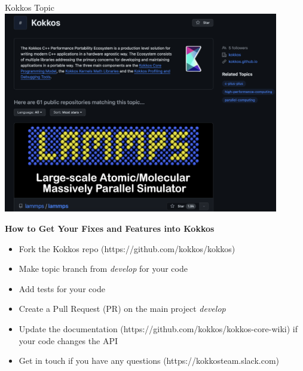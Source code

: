 \begin{frame}[fragile]{Kokkos Topic}
  \includegraphics[width=0.9\textwidth]{4_2/kokkos-topic}
\end{frame}
















\begin{frame}[fragile]

  \vspace{10pt}

  \textbf{How to Get Your Fixes and Features into Kokkos}
  \newline
  \begin{itemize}
    \item Fork the Kokkos repo (https://github.com/kokkos/kokkos)
    \item Make topic branch from \textit{develop} for your code
    \item Add tests for your code
    \item Create a Pull Request (PR) on the main project \textit{develop}
    \item Update the documentation (https://github.com/kokkos/kokkos-core-wiki) if your code changes the API
    \item Get in touch if you have any questions (https://kokkosteam.slack.com)
  \end{itemize}

\end{frame}



